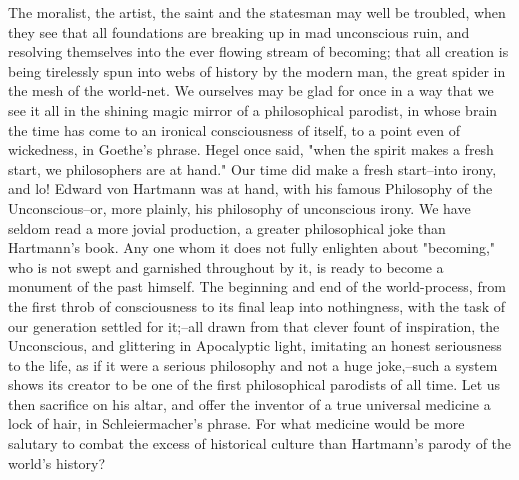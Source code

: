 The moralist, the artist, the saint and the statesman may well be
troubled, when they see that all foundations are breaking up in mad
unconscious ruin, and resolving themselves into the ever flowing
stream of becoming; that all creation is being tirelessly spun into
webs of history by the modern man, the great spider in the mesh of
the world-net. We ourselves may be glad for once in a way that we see
it all in the shining magic mirror of a philosophical parodist, in
whose brain the time has come to an ironical consciousness of itself,
to a point even of wickedness, in Goethe's phrase. Hegel once said,
"when the spirit makes a fresh start, we philosophers are at hand."
Our time did make a fresh start--into irony, and lo! Edward von
Hartmann was at hand, with his famous Philosophy of the
Unconscious--or, more plainly, his philosophy of unconscious irony.
We have seldom read a more jovial production, a greater philosophical
joke than Hartmann's book. Any one whom it does not fully enlighten
about "becoming," who is not swept and garnished throughout by it, is
ready to become a monument of the past himself. The beginning and end
of the world-process, from the first throb of consciousness to its
final leap into nothingness, with the task of our generation settled
for it;--all drawn from that clever fount of inspiration, the
Unconscious, and glittering in Apocalyptic light, imitating an honest
seriousness to the life, as if it were a serious philosophy and not a
huge joke,--such a system shows its creator to be one of the first
philosophical parodists of all time. Let us then sacrifice on his
altar, and offer the inventor of a true universal medicine a lock of
hair, in Schleiermacher's phrase. For what medicine would be more
salutary to combat the excess of historical culture than Hartmann's
parody of the world's history?


